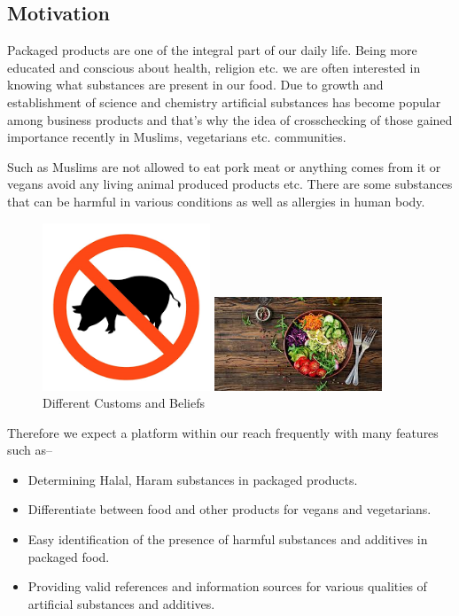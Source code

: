 \documentclass[a4paper,12pt]{report}
\begin{document}
\subsection*{Motivation}
Packaged products are one of the integral part of our daily life. Being more educated and conscious about health, religion etc. we are often interested in knowing what substances are present in our food. Due to growth and establishment of science and chemistry artificial substances has become popular among business products and that's why the idea of crosschecking of those gained importance recently in Muslims, vegetarians etc. communities.

Such as Muslims are not allowed to eat pork meat or anything comes from it \cite{muslim_pork_avoid} or vegans avoid any living animal produced products etc. There are some substances that can be harmful in various conditions as well as allergies in human body.
\begin{figure}[H]
	\centering
	\parbox{7cm}{
		\includegraphics[width=5cm,keepaspectratio]{pork_haram.png}
	}
	\parbox{7cm}{\includegraphics[width=5cm,keepaspectratio]{vegitables.png}}
	\caption{Different Customs and Beliefs}
\end{figure}
Therefore we expect a platform within our reach frequently with many features such as--
\begin{itemize}
	\item Determining Halal, Haram substances in packaged products.
	\item Differentiate between food and other products for vegans and vegetarians.
	\item Easy identification of the presence of harmful substances and additives in packaged food.
	\item Providing valid references and information sources for various qualities of artificial substances and additives.
\end{itemize}
\end{document}
